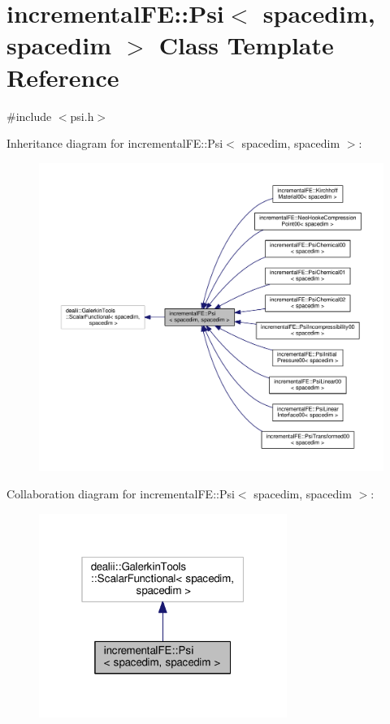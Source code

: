 \hypertarget{classincremental_f_e_1_1_psi_3_01spacedim_00_01spacedim_01_4}{}\section{incremental\+FE\+:\+:Psi$<$ spacedim, spacedim $>$ Class Template Reference}
\label{classincremental_f_e_1_1_psi_3_01spacedim_00_01spacedim_01_4}


{\ttfamily \#include $<$psi.\+h$>$}



Inheritance diagram for incremental\+FE\+:\+:Psi$<$ spacedim, spacedim $>$\+:
\nopagebreak
\begin{figure}[H]
\begin{center}
\leavevmode
\includegraphics[width=350pt]{classincremental_f_e_1_1_psi_3_01spacedim_00_01spacedim_01_4__inherit__graph}
\end{center}
\end{figure}


Collaboration diagram for incremental\+FE\+:\+:Psi$<$ spacedim, spacedim $>$\+:\nopagebreak
\begin{figure}[H]
\begin{center}
\leavevmode
\includegraphics[width=229pt]{classincremental_f_e_1_1_psi_3_01spacedim_00_01spacedim_01_4__coll__graph}
\end{center}
\end{figure}
